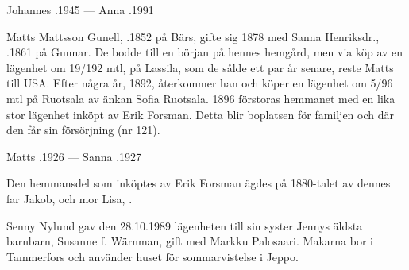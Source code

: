 Johannes .1945  ---  Anna .1991


Matts Mattsson Gunell, .1852 på Bärs, gifte sig 1878 med Sanna Henriksdr., .1861 på Gunnar. De bodde till en början på hennes hemgård, men via köp av en lägenhet om 19/192 mtl, på  Lassila, som de sålde ett par år senare, reste Matts till USA. Efter några år, 1892, återkommer han och köper en lägenhet om 5/96 mtl på Ruotsala av änkan Sofia Ruotsala. 1896 förstoras hemmanet med en lika stor lägenhet inköpt av Erik Forsman. Detta blir boplatsen för familjen och där den får sin försörjning (nr 121).
\begin{jhchildren}
  \item {}
  \item {}
  \item {}
  \item {}
  \item {}
  \item {}
  \item {}
  \item {}
  \item {}
  \item {}
\end{jhchildren}
Matts .1926  ---  Sanna .1927

Den hemmansdel som inköptes av Erik Forsman ägdes på 1880-talet av dennes far Jakob,  och mor Lisa, .





Senny Nylund gav den 28.10.1989 lägenheten till sin syster Jennys äldsta barnbarn, Susanne f. Wärnman, gift med Markku Palosaari. Makarna bor i Tammerfors och använder huset för sommarvistelse i Jeppo.\jhvspace{}


